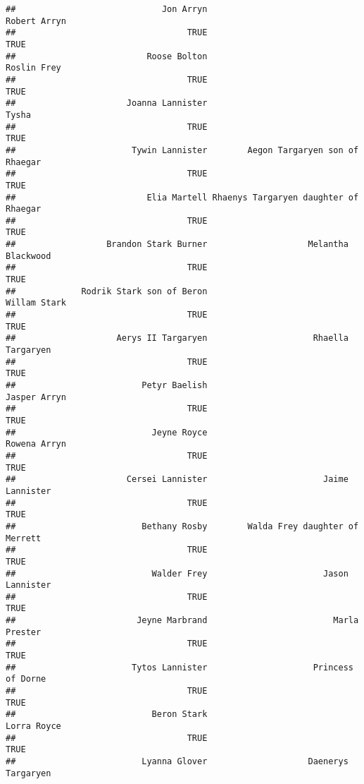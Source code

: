 \documentclass[
]{book}
\begin{document}
\begin{verbatim}
##                             Jon Arryn                          Robert Arryn 
##                                  TRUE                                  TRUE 
##                          Roose Bolton                           Roslin Frey 
##                                  TRUE                                  TRUE 
##                      Joanna Lannister                                 Tysha 
##                                  TRUE                                  TRUE 
##                       Tywin Lannister        Aegon Targaryen son of Rhaegar 
##                                  TRUE                                  TRUE 
##                          Elia Martell Rhaenys Targaryen daughter of Rhaegar 
##                                  TRUE                                  TRUE 
##                  Brandon Stark Burner                    Melantha Blackwood 
##                                  TRUE                                  TRUE 
##             Rodrik Stark son of Beron                          Willam Stark 
##                                  TRUE                                  TRUE 
##                    Aerys II Targaryen                     Rhaella Targaryen 
##                                  TRUE                                  TRUE 
##                         Petyr Baelish                          Jasper Arryn 
##                                  TRUE                                  TRUE 
##                           Jeyne Royce                          Rowena Arryn 
##                                  TRUE                                  TRUE 
##                      Cersei Lannister                       Jaime Lannister 
##                                  TRUE                                  TRUE 
##                         Bethany Rosby        Walda Frey daughter of Merrett 
##                                  TRUE                                  TRUE 
##                           Walder Frey                       Jason Lannister 
##                                  TRUE                                  TRUE 
##                        Jeyne Marbrand                         Marla Prester 
##                                  TRUE                                  TRUE 
##                       Tytos Lannister                     Princess of Dorne 
##                                  TRUE                                  TRUE 
##                           Beron Stark                           Lorra Royce 
##                                  TRUE                                  TRUE 
##                         Lyanna Glover                    Daenerys Targaryen 

\end{verbatim}
\end{document}
